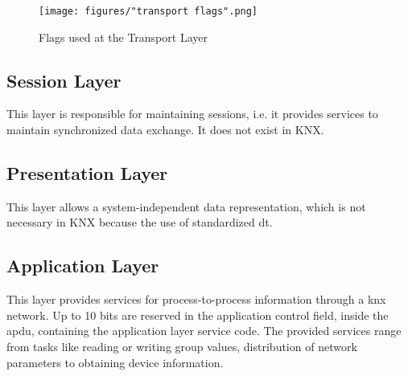 \begin{figure}
    \centering
    \texttt{[image: figures/"transport flags".png]}
    \caption{Flags used at the Transport Layer}
    \label{fig:tFlags}
\end{figure}

\subsection{Session Layer}

This layer is responsible for maintaining sessions, i.e. it provides services to maintain synchronized data exchange. It does not exist in KNX.

\subsection{Presentation Layer}

This layer allows a system-independent data representation, which is not necessary in KNX because the use of standardized \gls{dt}.

\subsection{Application Layer}

This layer provides services for process-to-process information through a \gls{knx} network. Up to 10 bits are reserved in the application control field,
inside the \gls{apdu}, containing the application layer service code. The provided services range from tasks like reading or writing group values, distribution of network
parameters to obtaining device information.